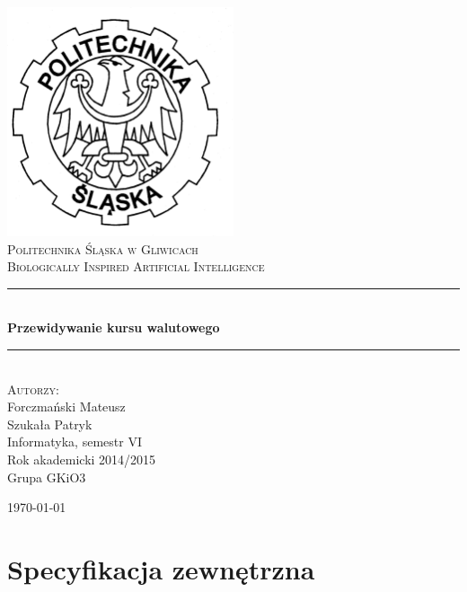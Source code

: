 \documentclass[a4paper]{article}
\newcommand{\HRule}{\rule{\linewidth}{0.5mm}}
\begin{document}


	\begin{titlepage}
		\begin{center}
			
			\includegraphics[width=0.5\textwidth]{./img/logo.png}~\\[1cm]
			
			\textsc{\LARGE Politechnika Śląska w Gliwicach}\\[1.5cm]
			
			\textsc{\Large Biologically Inspired Artificial Intelligence}\\[0.5cm]
			
			\HRule \\[0.4cm]
			{ \huge \bfseries Przewidywanie kursu walutowego  \\[0.4cm] }
			
			\HRule \\[1.5cm]
			
			\textsc{\Large Autorzy:} \\
			Forczmański Mateusz \\
			Szukała Patryk\\[1.0cm]
			
			Informatyka, semestr VI \\
			Rok akademicki 2014/2015 \\
			Grupa GKiO3
			
			\vfill
			
			{\large \today}
			
		\end{center}
	\end{titlepage}
	
	\part{Specyfikacja zewnętrzna}
\end{document}
